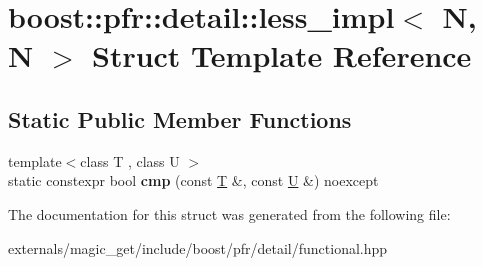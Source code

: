 \hypertarget{structboost_1_1pfr_1_1detail_1_1less__impl_3_01_n_00_01_n_01_4}{}\section{boost\+:\+:pfr\+:\+:detail\+:\+:less\+\_\+impl$<$ N, N $>$ Struct Template Reference}
\label{structboost_1_1pfr_1_1detail_1_1less__impl_3_01_n_00_01_n_01_4}
\subsection*{Static Public Member Functions}
\begin{DoxyCompactItemize}
\item 
\mbox{\label{structboost_1_1pfr_1_1detail_1_1less__impl_3_01_n_00_01_n_01_4_a0d809bdf3571ae870ca3602087e9685b}} 
{\footnotesize template$<$class T , class U $>$ }\\static constexpr bool {\bfseries cmp} (const \mbox{\hyperlink{struct_t}{T}} \&, const \mbox{\hyperlink{union_u}{U}} \&) noexcept
\end{DoxyCompactItemize}


The documentation for this struct was generated from the following file\+:\begin{DoxyCompactItemize}
\item 
externals/magic\+\_\+get/include/boost/pfr/detail/functional.\+hpp\end{DoxyCompactItemize}
